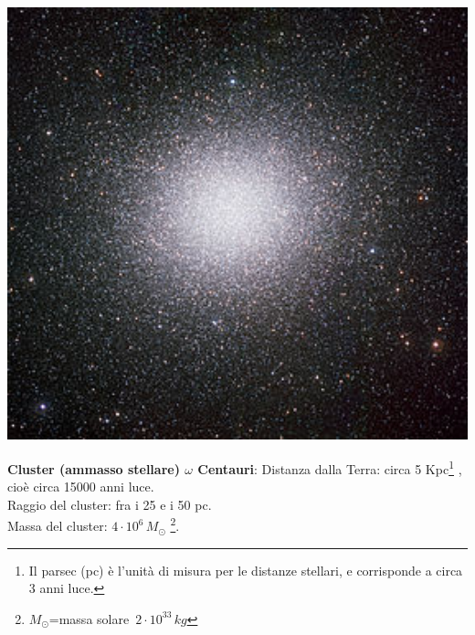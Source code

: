 \clearpage
\begin{minipage}{.3\textwidth}
\centering
\includegraphics[width=1\textwidth]{Img/w_centauri.jpg}
\end{minipage}
\begin{minipage}{.65\textwidth}
\textbf{Cluster (ammasso stellare) $\omega$ Centauri}:
Distanza dalla Terra: circa 5 Kpc\footnote{Il parsec (pc) è l'unità di misura per le distanze stellari, e corrisponde a circa 3 anni luce.} , cioè circa 15000 anni luce.\\
Raggio del cluster: fra i 25 e i 50 pc.\\
Massa del cluster: $4 \cdot 10^6 \, M_\odot$ \footnote{$M_\odot$=massa solare~$2 \cdot 10^{33} \, kg$}.
\end{minipage}

\vspace{0.2cm}

